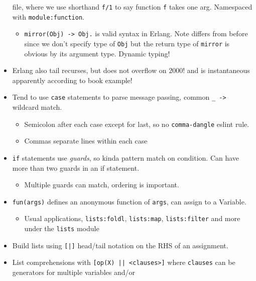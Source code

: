 \documentclass[10pt]{article}
\begin{document}
\begin{itemize}
        file, where we use shorthand \lstinline{f/1} to say function
        \lstinline{f} takes one arg. Namespaced with
        \lstinline{module:function}.
        \begin{itemize}
            \item \lstinline{mirror(Obj) -> Obj.} is valid syntax in Erlang.
                Note differs from before since we don't specify type of
                \lstinline{Obj} but the return type of \lstinline{mirror} is
                obvious by its argument type. Dynamic typing!
        \end{itemize}
    \item Erlang also tail recurses, but does not overflow on $2000!$ and is
        instantaneous apparently according to book example!
    \item Tend to use \lstinline{case} statements to parse message passing,
        common \lstinline{_ ->} wildcard match.
        \begin{itemize}
            \item Semicolon after each case except for last, so no
                \lstinline{comma-dangle} eslint rule.
            \item Commas separate lines within each case
        \end{itemize}
    \item \lstinline{if} statements use \emph{guards}, so kinda pattern match on
        condition. Can have more than two guards in an if statement.
        \begin{itemize}
            \item Multiple guards can match, ordering is important.
        \end{itemize}
    \item \lstinline{fun(args)} defines an anonymous function of
        \lstinline{args}, can assign to a Variable.
        \begin{itemize}
            \item Usual applications, \lstinline{lists:foldl},
                \lstinline{lists:map}, \lstinline{lists:filter} and more under
                the \lstinline{lists} module
        \end{itemize}
    \item Build lists using \lstinline{[|]} head/tail notation on the RHS of an
        assignment.
    \item List comprehensions with \lstinline{[op(X) || <clauses>]} where
        \lstinline{clauses} can be generators for multiple variables and/or

\end{itemize}
\end{document}
